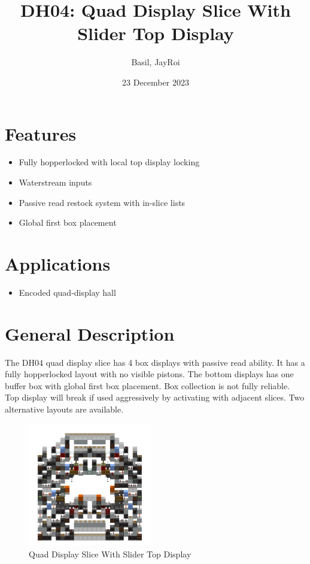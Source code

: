 \documentclass[10pt]{datasheet}
\title{DH04: Quad Display Slice With Slider Top Display}
\author{Basil, JayRoi}
\date{23 December 2023}
\begin{document}
\maketitle

\section{Features}

\begin{itemize}
\item{Fully hopperlocked with local top display locking}
\item{Waterstream inputs}
\item{Passive read restock system with in-slice lists}
\item{Global first box placement}
\end{itemize}

\section{Applications}

\begin{itemize}
\item{Encoded quad-display hall}
\end{itemize}

\section{General Description}
The DH04 quad display slice has 4 box displays with passive read ability. It has a fully hopperlocked layout with no visible pistons. The bottom displays has one buffer box with global first box placement. Box collection is not fully reliable. Top display will break if used aggressively by activating with adjacent slices. Two alternative layouts are available.

\vfill\break

\begin{figure}[H]
    \centering
    \includegraphics[width=0.48\textwidth]{slice2.png}
    \caption{\centering Quad Display Slice With Slider Top Display}
\end{figure}
\end{document}
